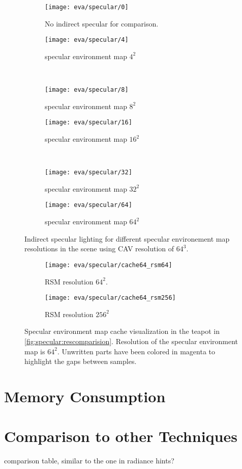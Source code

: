 \documentclass[thesis.tex]{subfiles}
\begin{document}
\begin{figure}
\begin{subfigure}[b]{\halfpageimage}
\texttt{[image: eva/specular/0]}
\caption{No indirect specular for comparison.}
\end{subfigure}
\begin{subfigure}[b]{\halfpageimage}
\texttt{[image: eva/specular/4]}
\caption{specular environment map $4^2$}
\end{subfigure}
\\
\begin{subfigure}[b]{\halfpageimage}
\texttt{[image: eva/specular/8]}
\caption{specular environment map $8^2$}
\end{subfigure}
\begin{subfigure}[b]{\halfpageimage}
\texttt{[image: eva/specular/16]}
\caption{specular environment map $16^2$}
\end{subfigure}
\\
\begin{subfigure}[b]{\halfpageimage}
\texttt{[image: eva/specular/32]}
\caption{specular environment map $32^2$}
\end{subfigure}
\begin{subfigure}[b]{\halfpageimage}
\texttt{[image: eva/specular/64]}
\caption{specular environment map $64^2$}
\end{subfigure}
\caption{Indirect specular lighting for different specular environement map resolutions in the  scene using CAV resolution of $64^3$. }
\label{fig:specular:rescomparision}
\end{figure}

\begin{figure}
\begin{subfigure}[b]{\halfpageimage}
\texttt{[image: eva/specular/cache64\_rsm64]}
\caption{RSM resolution $64^2$.}
\end{subfigure}
\begin{subfigure}[b]{\halfpageimage}
\texttt{[image: eva/specular/cache64\_rsm256]}
\caption{RSM resolution $256^2$}
\end{subfigure}
\caption{Specular environment map cache visualization in the teapot in \autoref{fig:specular:rescomparision}. Resolution of the specular environment map is $64^2$. Unwritten parts have been colored in magenta to highlight the gaps between samples. }
\label{fig:specular:cachegaps}
\end{figure}


\section{Memory Consumption}

\section{Comparison to other Techniques} \label{sec:eva:comparisiontoother}

comparison table, similar to the one in radiance hints?

\subfilebib %
\end{document}
